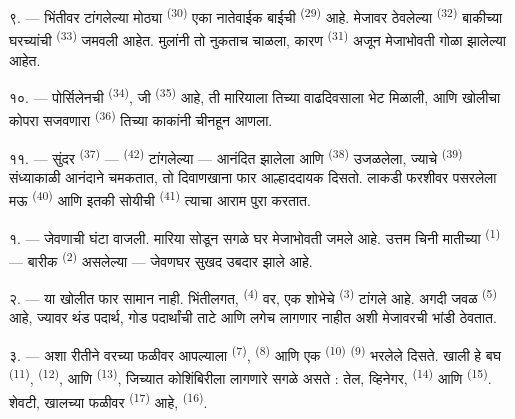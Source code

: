 ९. --- भिंतीवर टांगलेल्या मोठ्या  \textsuperscript{(30)} एका नातेवाईक बाईची
 \textsuperscript{(29)} आहे. मेजावर ठेवलेल्या 
\textsuperscript{(32)} बाकीच्या घरच्यांची  \textsuperscript{(33)} जमवली
आहेत. मुलांनी तो नुकताच चाळला, कारण  \textsuperscript{(31)} अजून मेजाभोवती
गोळा झालेल्या आहेत.

१०. --- पोर्सिलेनची  \textsuperscript{(34)}, जी
 \textsuperscript{(35)} आहे, ती मारियाला तिच्या वाढदिवसाला भेट
मिळाली, आणि खोलीचा कोपरा सजवणारा  \textsuperscript{(36)} तिच्या काकांनी चीनहून
आणला.

११. --- सुंदर  \textsuperscript{(37)} — 
\textsuperscript{(42)} टांगलेल्या — आनंदित झालेला आणि  \textsuperscript{(38)}
उजळलेला, ज्याचे  \textsuperscript{(39)} संध्याकाळी आनंदाने चमकतात, तो
दिवाणखाना फार आल्हाददायक दिसतो. लाकडी फरशीवर पसरलेला मऊ  \textsuperscript{(40)}
आणि इतकी सोयीची  \textsuperscript{(41)} त्याचा आराम पुरा करतात.

\VUsaut{3.6mm}
\VUsaut{3.0mm}

१. --- जेवणाची घंटा वाजली. मारिया सोडून सगळे घर मेजाभोवती जमले आहे. उत्तम चिनी मातीच्या
 \textsuperscript{(1)} — बारीक  \textsuperscript{(2)} असलेल्या —
जेवणघर सुखद उबदार झाले आहे.

२. --- या खोलीत फार सामान नाही. भिंतीलगत,  \textsuperscript{(4)} वर,
एक शोभेचे  \textsuperscript{(3)} टांगले आहे. अगदी जवळ 
\textsuperscript{(5)} आहे, ज्यावर थंड पदार्थ, गोड पदार्थांची ताटे आणि लगेच लागणार नाहीत अशी
मेजावरची भांडी ठेवतात.

३. --- अशा रीतीने वरच्या फळीवर आपल्याला  \textsuperscript{(7)},
 \textsuperscript{(8)} आणि एक  \textsuperscript{(10)} 
\textsuperscript{(9)} भरलेले दिसते. खाली हे बघ  \textsuperscript{(11)},
 \textsuperscript{(12)}, आणि  \textsuperscript{(13)},
जिच्यात कोशिंबिरीला लागणारे सगळे असते : तेल, व्हिनेगर,  \textsuperscript{(14)} आणि
 \textsuperscript{(15)}. शेवटी, खालच्या फळीवर  \textsuperscript{(17)}
आहे,  \textsuperscript{(16)}.

